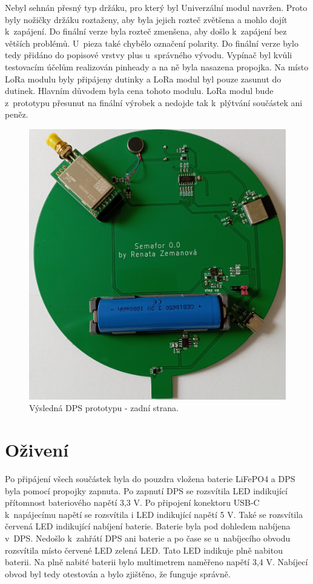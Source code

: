 Nebyl sehnán přesný typ držáku, pro který byl Univerzální modul navržen. Proto byly nožičky držáku roztaženy, aby byla jejich rozteč zvětšena a mohlo dojít k~zapájení. Do finální 
verze byla rozteč zmenšena, aby došlo k~zapájení bez větších problémů. U~pieza také chybělo 
označení polarity. Do finální verze bylo tedy přidáno do popisové vrstvy plus u~správného vývodu. Vypínač byl kvůli testovacím účelům realizován pinheady a na ně byla nasazena 
propojka. Na místo LoRa modulu byly připájeny dutinky a LoRa modul byl pouze zasunut do dutinek. Hlavním důvodem byla cena tohoto modulu. LoRa modul bude z~prototypu přesunut 
na finální výrobek a nedojde tak k~plýtvání součástek ani peněz.

\begin{figure}[!h]
  \begin{center}
    \includegraphics[scale=0.15]{obrazky/DPS_prototyp_bottom.jpg}
  \end{center}
  \caption[Výsledná DPS prototypu - zadní strana]{Výsledná DPS prototypu - zadní strana.}
\end{figure}

\section{Oživení}
Po připájení všech součástek byla do pouzdra vložena baterie LiFePO4 a DPS byla pomocí propojky zapnuta. Po zapnutí DPS se rozsvítila LED indikující přítomnost bateriového napětí 3,3 V. 
Po připojení konektoru USB-C k~napájecímu napětí se rozsvítila i LED indikující napětí 5 V. Také se rozsvítila červená LED indikující nabíjení baterie. Baterie byla pod dohledem 
nabíjena v~DPS. Nedošlo k~zahřátí DPS ani baterie a po čase se u~nabíjecího obvodu rozsvítila místo červené LED zelená LED. Tato LED indikuje plně nabitou baterii. Na plně nabité 
baterii bylo multimetrem naměřeno napětí 3,4 V. Nabíjecí obvod byl tedy otestován a bylo zjištěno, že funguje správně. 

